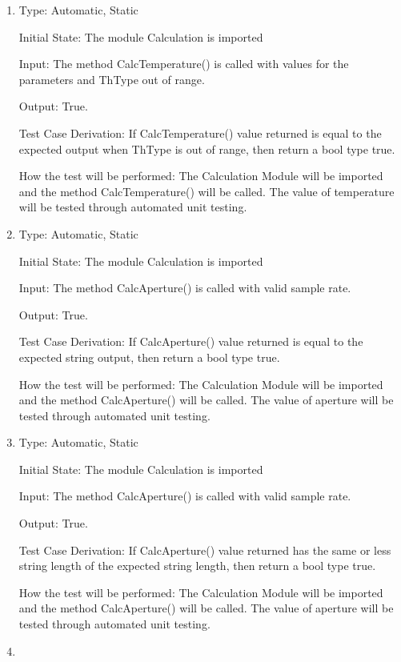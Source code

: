 \documentclass[12pt, titlepage]{article}
\begin{document}
\begin{enumerate}[{UT-C}1.]
  
\item
  
  Type: Automatic, Static 

  Initial State:  The module Calculation is imported

  Input: The method CalcTemperature() is called  with values for the parameters and ThType out of range. 

  Output: True.

  Test Case Derivation: If CalcTemperature() value returned is equal to the expected output when ThType is out of range, then return a bool type true.

  How the test will be performed: The Calculation Module will be imported and the method CalcTemperature() will be called. The value of temperature will be tested through automated unit testing.

  \item
  
  Type: Automatic, Static 

  Initial State: The module Calculation is imported

  Input: The method CalcAperture() is called  with valid sample rate. 

  Output: True.

  Test Case Derivation: If CalcAperture() value returned is equal to the expected string output, then return a bool type true.

  How the test will be performed: The Calculation Module will be imported and the method CalcAperture() will be called. The value of aperture will be tested through automated unit testing.
  
  \item
  
  Type: Automatic, Static 

  Initial State: The module Calculation is imported

  Input: The method CalcAperture() is called  with valid sample rate. 

  Output: True.

  Test Case Derivation: If CalcAperture() value returned has the same or less string length of the expected string length, then return a bool type true.

  How the test will be performed: The Calculation Module will be imported and the method CalcAperture() will be called. The value of aperture will be tested through automated unit testing.
  
  \item
  

\end{enumerate}
\end{document}
